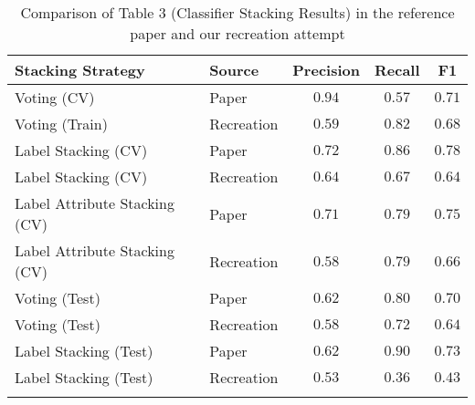 

\begin{table*}[h]
	\begin{tabular}{|l|l|ccc|}
		\hline
		Stacking Strategy & Source & Precision & Recall & F1 \\
		\hline
		Voting (CV) & Paper & $0.94$ & $0.57$ & $0.71$ \\
		Voting (Train) & Recreation & $0.59$ & $0.82$ & $0.68$ \\
		\hline
		Label Stacking (CV) & Paper & $0.72$ & $0.86$ & $0.78$ \\
		Label Stacking (CV) & Recreation & $0.64$ & $0.67$ & $0.64$ \\
		\hline
		Label Attribute Stacking (CV) & Paper & $0.71$ & $0.79$ & $0.75$ \\
		Label Attribute Stacking (CV) & Recreation & $0.58$ & $0.79$ & $0.66$ \\
		\hline
		Voting (Test) & Paper & $0.62$ & $0.80$ & $0.70$ \\
		Voting (Test) & Recreation & $0.58$ & $0.72$ & $0.64$ \\
		\hline
		Label Stacking (Test) & Paper & $0.62$ & $0.90$ & $0.73$ \\
		Label Stacking (Test) & Recreation & $0.53$ & $0.36$ & $0.43$ \\
		\hline
		\multicolumn{5}{c}{ } \\
	\end{tabular}
	\caption{Comparison of Table 3 (Classifier Stacking Results) in the reference paper and our recreation attempt}
	\label{table3}
\end{table*}